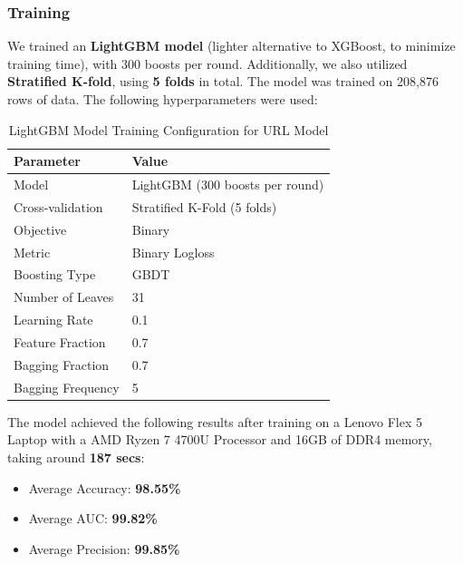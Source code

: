 \documentclass{article}
\begin{document}
\subsubsection*{Training}

\noindent
We trained an \textbf{LightGBM model} (lighter alternative to XGBoost, to minimize training time), with 300 boosts per round. Additionally, we also utilized \textbf{Stratified K-fold}, using \textbf{5 folds} in total. The model was trained on 208,876 rows of data. The following hyperparameters were used: 

\begin{table}[h!]
    \centering
    \renewcommand{\arraystretch}{1.2}
    \setlength{\tabcolsep}{11pt}
    \begin{tabular}{|l|l|}
        \hline
        \textbf{Parameter} & \textbf{Value} \\
        \hline
        Model & LightGBM (300 boosts per round) \\
        \hline
        Cross-validation & Stratified K-Fold (5 folds) \\
        \hline
        Objective & Binary \\
        \hline
        Metric & Binary Logloss \\
        \hline
        Boosting Type & GBDT \\
        \hline
        Number of Leaves & 31 \\
        \hline
        Learning Rate & 0.1 \\
        \hline
        Feature Fraction & 0.7 \\
        \hline
        Bagging Fraction & 0.7 \\
        \hline
        Bagging Frequency & 5 \\
        \hline
    \end{tabular}
    \caption{LightGBM Model Training Configuration for URL Model}
\end{table}


\noindent
The model achieved the following results after training on a Lenovo Flex 5 Laptop with a AMD Ryzen 7 4700U Processor and 16GB of DDR4 memory, taking around \textbf{187 secs}:

\begin{itemize}
    \item Average Accuracy: \textbf{98.55\%}
    \item Average AUC: \textbf{99.82\%}
    \item Average Precision: \textbf{99.85\%}
\end{itemize} 
\end{document}
